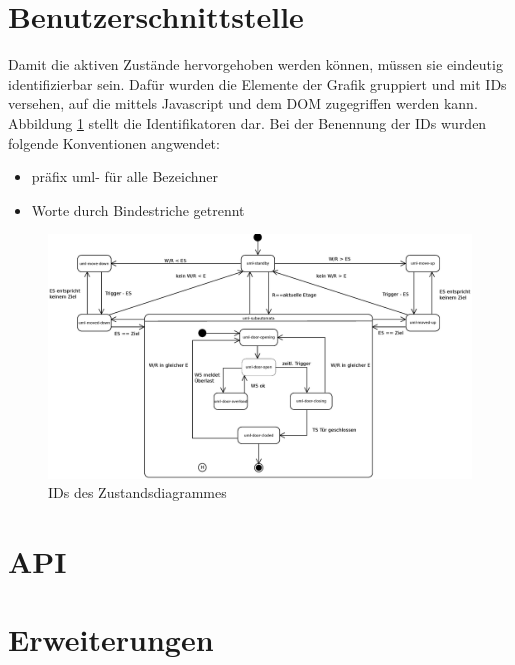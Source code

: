 \section{Benutzerschnittstelle}
Damit die aktiven Zustände hervorgehoben werden können, müssen sie eindeutig identifizierbar sein. Dafür wurden die Elemente der Grafik gruppiert und mit IDs versehen, auf die mittels Javascript und dem \acrshort{DOM} zugegriffen werden kann. Abbildung \ref{fig:ZD_id_view} stellt die Identifikatoren dar. Bei der Benennung der IDs wurden folgende Konventionen angwendet:
\begin{itemize}
	\item präfix uml- für alle Bezeichner
	\item Worte durch Bindestriche getrennt
\end{itemize}

\begin{figure}[hbt]
	\centering
	\includegraphics[width=\textwidth]{images/ZDv6_id_view.eps}
	\caption{IDs des Zustandsdiagrammes}%
	\label{fig:ZD_id_view}%
\end{figure}

\section{API}

\section{Erweiterungen}

